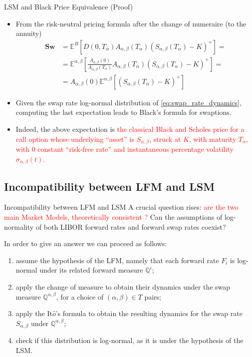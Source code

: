 \documentclass{beamer}
\begin{document}
\begin{frame}{LSM and Black Price Equivalence (Proof)}
	\begin{itemize}
		\item From the risk-neutral pricing formula after the change of numeraire (to the annuity)
		\begin{equation*}
			\begin{aligned}
			\textbf{Sw}&=\mathbb{E}^B\left[D(0,T_\alpha)A_{\alpha,\beta}(T_\alpha)(S_{\alpha,\beta}(T_\alpha)-K)^+\right] = \\
			&=\mathbb{E}^{\alpha,\beta}\left[\frac{A_{\alpha,\beta}(0)}{A_{\alpha,\beta}(T_\alpha)}A_{\alpha,\beta}(T_\alpha)(S_{\alpha,\beta}(T_\alpha)-K)^+\right] = \\		
			&= A_{\alpha,\beta}(0)\mathbb{E}^{\alpha,\beta}\left[(S_{\alpha,\beta}(T_\alpha)-K)^+\right]
		\end{aligned}
		\end{equation*}
		\item Given the swap rate log-normal distribution of \cref{eq:swap_rate_dynamics}, computing the last expectation leads to Black’s formula for swaptions.
		\item Indeed, the above expectation is \textcolor{red}{the classical Black and Scholes price for a call option whose underlying “asset” is $S_{\alpha,\beta}$, struck at $K$, with maturity $T_\alpha$, with 0 constant “risk-free rate” and instantaneous percentage volatility $\sigma_{\alpha,\beta}(t)$.}
	\end{itemize}
\end{frame}

\subsection{Incompatibility between LFM and LSM}
\begin{frame}{Incompatibility between LFM and LSM}
  A crucial question rises: \textcolor{red}{are the two main Market Models, theoretically consistent ?} 
  Can the assumptions of log-normality of both LIBOR forward rates and forward swap rates coexist? 
  \pause
  
  In order to give an answer we can proceed as follows:
  \begin{enumerate}
  \item<2-> assume the hypothesis of the LFM, namely that each forward rate $F_i$ is log-normal under its related forward measure $\mathbb{Q}^i$;
  \item<3-> apply the change of measure to obtain their dynamics under the swap measure $\mathbb{Q}^{\alpha,\beta}$, for a choice of $(\alpha,\beta) \in T$ pairs;
  \item<4-> apply the It$\hat{o}$’s formula to obtain the resulting dynamics for the swap rate $S_{\alpha,\beta}$ under $\mathbb{Q}^{\alpha,\beta}$;
  \item<5-> check if this distribution is log-normal, as it is under the hypothesis of the LSM.
  \end{enumerate}
\end{frame}
\end{document}
